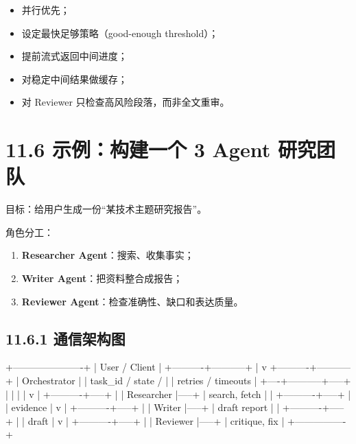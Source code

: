 \begin{itemize}[leftmargin=2em]
\item 并行优先；
\item 设定最快足够策略（good-enough threshold）；
\item 提前流式返回中间进度；
\item 对稳定中间结果做缓存；
\item 对 Reviewer 只检查高风险段落，而非全文重审。
\end{itemize}

\section{11.6 示例：构建一个 3 Agent 研究团队}

目标：给用户生成一份``某技术主题研究报告''。


角色分工：


\begin{enumerate}[leftmargin=2em]
\item \textbf{Researcher Agent}：搜索、收集事实；
\item \textbf{Writer Agent}：把资料整合成报告；
\item \textbf{Reviewer Agent}：检查准确性、缺口和表达质量。
\end{enumerate}

\subsection{11.6.1 通信架构图}

\begin{codeblock}
                            +----------------------+
                            |   User / Client      |
                            +----------+-----------+
                                       |
                                       v
                            +----------+-----------+
                            |   Orchestrator       |
                            | task_id / state /    |
                            | retries / timeouts   |
                            +----+-----------+-----+
                                 |           |
                                 |           |
                                 v           |
                      +----------+-----+     |
                      | Researcher     |-----+
                      | search, fetch  |     |
                      +----------+-----+     |
                                 | evidence  |
                                 v           |
                      +----------+-----+     |
                      | Writer         |-----+
                      | draft report   |     |
                      +----------+-----+     |
                                 | draft     |
                                 v           |
                      +----------+-----+     |
                      | Reviewer       |-----+
                      | critique, fix  |
                      +----------------+
\end{codeblock}


